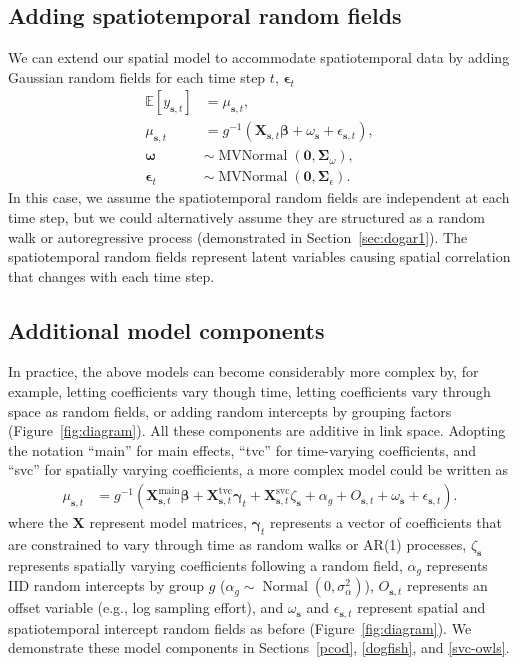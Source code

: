 \documentclass[article]{jss}\usepackage[]{graphicx}\usepackage[dvipsnames]{xcolor}
\begin{document}
\subsection{Adding spatiotemporal random fields}

We can extend our spatial model to accommodate spatiotemporal data by adding Gaussian random fields for each time step $t$, $\bm{\epsilon}_{t}$
\[
\begin{aligned}
\mathbb{E}[y_{\bm{s},t}] &= \mu_{\bm{s},t},\\
\mu_{\bm{s},t} &=
g^{-1} \left( \bm{X}_{\bm{s},t} \bm{\beta} + \omega_{\bm{s}} + \epsilon_{\bm{s},t} \right),\\
\bm{\omega} &\sim \operatorname{MVNormal} \left( \bm{0}, \bm{\Sigma}_\omega \right),\\
\bm{\epsilon}_{t} &\sim \operatorname{MVNormal} \left( \bm{0}, \bm{\Sigma}_{\epsilon} \right).
\end{aligned}
\]
In this case, we assume the spatiotemporal random fields are independent at each time step, but we could alternatively assume they are structured as a random walk or autoregressive process (demonstrated in Section~\ref{sec:dogar1}).
The spatiotemporal random fields represent latent variables causing spatial correlation that changes with each time step.

\subsection{Additional model components}

In practice, the above models can become considerably more complex by, for example, letting coefficients vary though time, letting coefficients vary through space \citep{hastie1993} as random fields, or adding random intercepts by grouping factors (Figure~\ref{fig:diagram}).
All these components are additive in link space.
Adopting the notation ``main'' for main effects, ``tvc'' for time-varying coefficients, and ``svc'' for spatially varying coefficients, a more complex model could be written as
\[
\begin{aligned}
\mu_{\bm{s},t} &=
g^{-1} \left( \bm{X}^{\mathrm{main}}_{\bm{s},t} \bm{\beta} +
\bm{X}^{\mathrm{tvc}}_{\bm{s},t} \bm{\gamma}_t +
\bm{X}^{\mathrm{svc}}_{\bm{s},t} \zeta_{\bm{s}} +
\alpha_g +
O_{\bm{s},t} +
\omega_{\bm{s}} +
\epsilon_{\bm{s},t} \right).
\end{aligned}
\]
where the $\bm{X}$ represent model matrices, $\bm{\gamma}_t$ represents a vector of coefficients that are constrained to vary through time as random walks or AR(1) processes, $\zeta_{\bm{s}}$ represents spatially varying coefficients following a random field, $\alpha_g$ represents IID random intercepts by group $g$ ($\alpha_g \sim \operatorname{Normal} \left(0, \sigma_\alpha^2 \right)$), $O_{\bm{s},t}$ represents an offset variable \citep[][p.~206]{mccullagh1989} (e.g., log sampling effort), and $\omega_{\bm{s}}$ and $\epsilon_{\bm{s},t}$ represent spatial and spatiotemporal intercept random fields as before (Figure~\ref{fig:diagram}).
We demonstrate these model components in Sections~\ref{pcod}, \ref{dogfish}, and \ref{svc-owls}.
\end{document}
